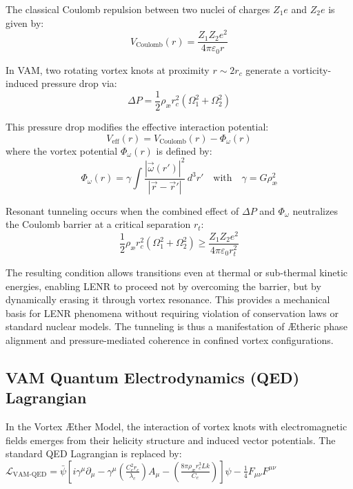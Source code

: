 The classical Coulomb repulsion between two nuclei of charges \( Z_1 e \) and \( Z_2 e \) is given by:
\begin{equation}
    V_{\text{Coulomb}}(r) = \frac{Z_1 Z_2 e^2}{4\pi \varepsilon_0 r}
\end{equation}

In VAM, two rotating vortex knots at proximity \( r \sim 2r_c \) generate a vorticity-induced pressure drop via:
\begin{equation}
    \Delta P = \frac{1}{2} \rho_{\text{\ae}} r_c^2 (\Omega_1^2 + \Omega_2^2)
\end{equation}

This pressure drop modifies the effective interaction potential:
\begin{equation}
    V_{\text{eff}}(r) = V_{\text{Coulomb}}(r) - \Phi_\omega(r)
\end{equation}
where the vortex potential \( \Phi_\omega(r) \) is defined by:
\begin{equation}
    \Phi_\omega(r) = \gamma \int \frac{|\vec{\omega}(r')|^2}{|\vec{r} - \vec{r}'|} \, d^3r'
    \quad \text{with} \quad
    \gamma = G \rho_{\text{\ae}}^2
\end{equation}

Resonant tunneling occurs when the combined effect of \( \Delta P \) and \( \Phi_\omega \) neutralizes the Coulomb barrier at a critical separation \( r_t \):
\begin{equation}
    \frac{1}{2} \rho_{\text{\ae}} r_c^2 (\Omega_1^2 + \Omega_2^2) \geq \frac{Z_1 Z_2 e^2}{4\pi \varepsilon_0 r_t^2}
\end{equation}

The resulting condition allows transitions even at thermal or sub-thermal kinetic energies, enabling LENR to proceed not by overcoming the barrier, but by dynamically erasing it through vortex resonance. This provides a mechanical basis for LENR phenomena without requiring violation of conservation laws or standard nuclear models. The tunneling is thus a manifestation of Ætheric phase alignment and pressure-mediated coherence in confined vortex configurations.


\subsection*{VAM Quantum Electrodynamics (QED) Lagrangian}

In the Vortex \AE ther Model, the interaction of vortex knots with electromagnetic fields emerges from their helicity structure and induced vector potentials. The standard QED Lagrangian is replaced by:
$ \mathcal{L}_{\text{VAM-QED}} =
\bar{\psi} \left[ i \gamma^\mu \partial_\mu
               - \gamma^\mu \left( \frac{C_e^2 r_c}{\lambda_c} \right) A_\mu
               - \left( \frac{8\pi \rho_{\text{\ae}} r_c^3 Lk}{C_e} \right) \right] \psi
- \frac{1}{4} F_{\mu\nu} F^{\mu\nu} $

